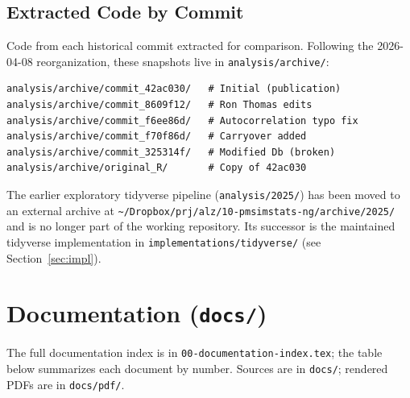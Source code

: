 \documentclass[11pt]{article}
\begin{document}
\subsection{Extracted Code by Commit}

Code from each historical commit extracted for comparison.
Following the 2026-04-08 reorganization, these snapshots live
in \texttt{analysis/archive/}:

\begin{verbatim}
analysis/archive/commit_42ac030/   # Initial (publication)
analysis/archive/commit_8609f12/   # Ron Thomas edits
analysis/archive/commit_f6ee86d/   # Autocorrelation typo fix
analysis/archive/commit_f70f86d/   # Carryover added
analysis/archive/commit_325314f/   # Modified Db (broken)
analysis/archive/original_R/       # Copy of 42ac030
\end{verbatim}

The earlier exploratory tidyverse pipeline (\texttt{analysis/2025/})
has been moved to an external archive at
\texttt{\textasciitilde/Dropbox/prj/alz/10-pmsimstats-ng/archive/2025/}
and is no longer part of the working repository. Its successor
is the maintained tidyverse implementation in
\texttt{implementations/tidyverse/} (see Section~\ref{sec:impl}).

\section{Documentation (\texttt{docs/})}

The full documentation index is in
\texttt{00-documentation-index.tex}; the table below summarizes
each document by number. Sources are in \texttt{docs/}; rendered
PDFs are in \texttt{docs/pdf/}.
\end{document}

